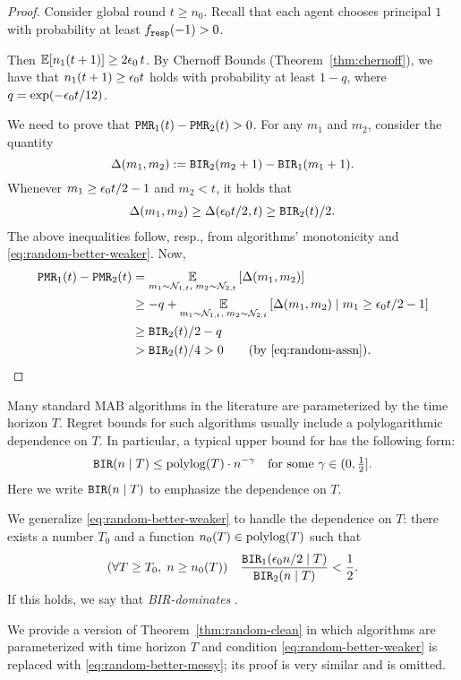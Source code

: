 \begin{proof}
Consider global round $t\geq n_0$. Recall that each agent chooses principal $1$ with probability at least
    $f_{\mathtt{resp}}(-1)>0$.

Then
    $\E[n_1(t+1)] \geq 2\eps_0\,t $.
By Chernoff Bounds (Theorem~\ref{thm:chernoff}), we have that
    $n_1(t+1)\geq \epsilon_0 t$
holds with probability at least $1-q$,
where $q = \exp(-\epsilon_0 t/12)$.

We need to prove that
    $\mathtt{PMR}_1(t) - \mathtt{PMR}_2(t)>0$.
For any $m_1$ and $m_2$, consider the quantity
\[ \Delta(m_1,m_2) := \mathtt{BIR}_2(m_2+1) - \mathtt{BIR}_1(m_1+1).\]
Whenever $m_1 \geq \epsilon_0 t/2 -1$ and $m_2<t$, it holds that
\begin{align*}
\Delta(m_1,m_2) \geq \Delta(\epsilon_0 t / 2, t)
    \geq \mathtt{BIR}_2(t)/2.
\end{align*}
The above inequalities follow, resp., from algorithms' monotonicity and \eqref{eq:random-better-weaker}. Now,
\begin{align*}
\mathtt{PMR}_1(t) - \mathtt{PMR}_2(t)
    &= \operatorname*{\mathbb{E}}_{m_1\sim \mathcal{N}_{1,t},\;m_2\sim \mathcal{N}_{2,t}}\left[\Delta(m_1,m_2)\right] \\
    &\geq -q
        + \operatorname*{\mathbb{E}}_{m_1\sim \mathcal{N}_{1,t},\;m_2\sim \mathcal{N}_{2,t}}\left[\Delta(m_1,m_2)\mid m_1 \geq \epsilon_0 t/2-1\right] \\
    &\geq \mathtt{BIR}_2(t)/2-q \\
    &> \mathtt{BIR}_2(t)/4 > 0  \qquad\text{(by \eqref{eq:random-assn})}. \qedhere
\end{align*}
\end{proof}

\begin{remark}\label{rem:random-messy}
  Many standard MAB algorithms in the literature are parameterized by
  the time horizon $T$. Regret bounds for such algorithms usually
  include a polylogarithmic dependence on $T$. In particular, a
  typical upper bound for \BIR has the following form:
\begin{align}
    \BIR(n\mid T)\leq \polylog(T)\cdot n^{-\gamma}
    \quad \text{for some $\gamma\in(0,\tfrac12]$}.
\end{align}
Here we write $\mathtt{BIR}(n\mid T)$ to emphasize the dependence on $T$.

We generalize \eqref{eq:random-better-weaker} to handle the dependence
on $T$: there exists a number $T_0$ and a function $n_0(T)\in \polylog(T)$ 
such that 
\begin{align}\label{eq:random-better-messy}
(\forall T\geq T_0,\; n\geq n_0(T)) \quad
\frac{\mathtt{BIR}_1(\epsilon_0 n /2\mid T)}{\mathtt{BIR}_2(n\mid T)} <\frac12.
\end{align}
If this holds, we say that \alg[1] \emph{BIR-dominates} \alg[2].

We provide a version of Theorem~\ref{thm:random-clean} in which algorithms are parameterized with time horizon $T$ and condition \eqref{eq:random-better-weaker} is replaced with \eqref{eq:random-better-messy}; its proof is very similar and is omitted.
\end{remark}

